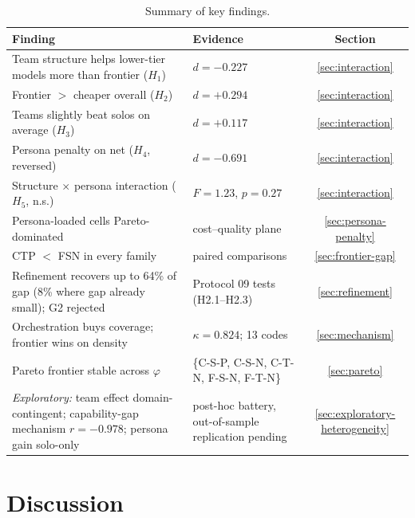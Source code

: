 \documentclass[12pt,a4paper]{article}
\newcommand{\phiBlend}{\varphi}
\begin{document}
\begin{table}[ht]
  \centering
  \caption{Summary of key findings.}
  \label{tab:summary-findings}
  \begin{tabularx}{\textwidth}{@{}l l c@{}}
    \toprule
    \textbf{Finding} & \textbf{Evidence} & \textbf{Section} \\
    \midrule
    Team structure helps lower-tier models more than frontier ($H_1$) & $d = -0.227$ & \cref{sec:interaction} \\
    Frontier $>$ cheaper overall ($H_2$) & $d = +0.294$ & \cref{sec:interaction} \\
    Teams slightly beat solos on average ($H_3$) & $d = +0.117$ & \cref{sec:interaction} \\
    Persona penalty on net ($H_4$, reversed) & $d = -0.691$ & \cref{sec:interaction} \\
    Structure $\times$ persona interaction ($H_5$, n.s.) & $F = 1.23$, $p = 0.27$ & \cref{sec:interaction} \\
    Persona-loaded cells Pareto-dominated & cost--quality plane & \cref{sec:persona-penalty} \\
    CTP $<$ FSN in every family & paired comparisons & \cref{sec:frontier-gap} \\
    Refinement recovers up to 64\% of gap (8\% where gap already small); G2 rejected & Protocol 09 tests (H2.1--H2.3) & \cref{sec:refinement} \\
    Orchestration buys coverage; frontier wins on density & $\kappa = 0.824$; 13 codes & \cref{sec:mechanism} \\
    Pareto frontier stable across $\phiBlend$ & \{C-S-P, C-S-N, C-T-N, F-S-N, F-T-N\} & \cref{sec:pareto} \\
    \emph{Exploratory:} team effect domain-contingent; capability-gap mechanism $r = -0.978$; persona gain solo-only & post-hoc battery, out-of-sample replication pending & \cref{sec:exploratory-heterogeneity} \\
    \bottomrule
  \end{tabularx}
\end{table}

\section{Discussion}\label{sec:discussion}
\end{document}
